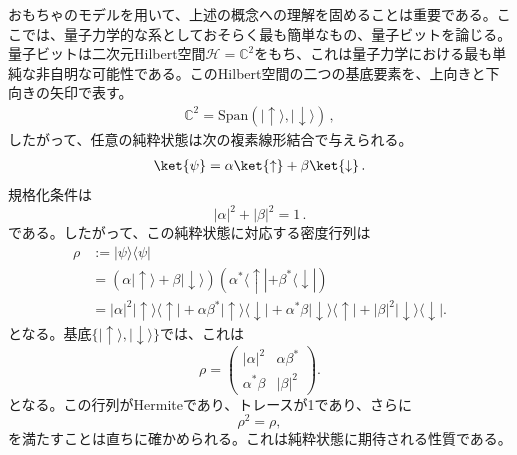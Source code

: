 \documentclass[a4paper,11pt,oneside]{article}
\theoremstyle{definition}
\numberwithin{equation}{section}
\begin{document}
おもちゃのモデルを用いて、上述の概念への理解を固めることは重要である。ここでは、量子力学的な系としておそらく最も簡単なもの、量子ビットを論じる。量子ビットは二次元Hilbert空間$ \mathcal{H}= \mathbb{C}^{2}$をもち、これは量子力学における最も単純な非自明な可能性である。このHilbert空間の二つの基底要素を、上向きと下向きの矢印で表す。
\begin{align}
\mathbb{C}^{2}=\text{Span}(|\uparrow\rangle,|\downarrow \rangle)\,,
\end{align}
したがって、任意の純粋状態は次の複素線形結合で与えられる。
\begin{align}
\ket{\psi}=\alpha \ket{\uparrow}+\beta\ket{\downarrow}\,.
\end{align}
規格化条件は
\begin{equation}
|\alpha|^{2}+|\beta|^{2}=1 \,.
\end{equation}
である。したがって、この純粋状態に対応する密度行列は
\begin{align}
\rho
&:= |\psi\rangle\langle\psi|
\nonumber\\
&= (\alpha |\uparrow\rangle+\beta |\downarrow\rangle)
(\alpha^{*}\langle\uparrow|+\beta^{*}\langle\downarrow|)
\nonumber\\
&= |\alpha|^{2} |\uparrow\rangle\langle\uparrow|
+\alpha\beta^{*} |\uparrow\rangle\langle\downarrow|
+\alpha^{*}\beta |\downarrow\rangle\langle\uparrow|
+|\beta|^{2} |\downarrow\rangle\langle\downarrow| .
\end{align}
となる。基底$\{|\uparrow\rangle,|\downarrow\rangle\}$では、これは
\begin{equation}
\rho =
\begin{pmatrix}
|\alpha|^{2} & \alpha\beta^{*} \\
\alpha^{*}\beta & |\beta|^{2}
\end{pmatrix} .
\end{equation}
となる。この行列がHermiteであり、トレースが1であり、さらに
\begin{equation}
\rho^{2}=\rho ,
\end{equation}
を満たすことは直ちに確かめられる。これは純粋状態に期待される性質である。
\end{document}
